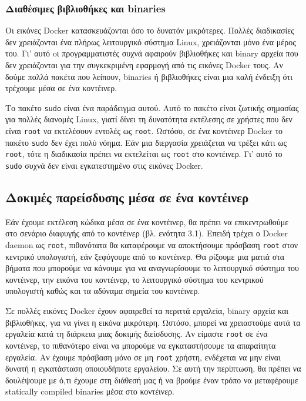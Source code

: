 \subsubsection{Διαθέσιμες βιβλιοθήκες και \textlatin{binaries}}

Οι εικόνες \textlatin{Docker} κατασκευάζονται όσο το δυνατόν μικρότερες. Πολλές
διαδικασίες δεν χρειάζονται ένα πλήρως λειτουργικό σύστημα \textlatin{Linux},
χρειάζονται μόνο ένα μέρος του. Γι' αυτό oι προγραμματιστές συχνά αφαιρούν
βιβλιοθήκες και \textlatin{binary} αρχεία που δεν χρειάζονται για την
συγκεκριμένη εφαρμογή από τις εικόνες \textlatin{Docker} τους. Αν δούμε πολλά
πακέτα που λείπουν, \textlatin{binaries} ή βιβλιοθήκες είναι μια καλή ένδειξη
ότι τρέχουμε μέσα σε ένα κοντέινερ.

Το πακέτο \texttt{\textlatin{sudo}} είναι ένα παράδειγμα αυτού. Αυτό το πακέτο
είναι ζωτικής σημασίας για πολλές διανομές \textlatin{Linux}, γιατί δίνει τη
δυνατότητα εκτέλεσης σε χρήστες που δεν είναι \texttt{\textlatin{root}} να
εκτελέσουν εντολές ως \texttt{\textlatin{root}}. Ωστόσο, σε ένα κοντέινερ
\textlatin{Docker} το πακέτο \texttt{\textlatin{sudo}} δεν έχει πολύ νόημα. Εάν
μια διεργασία χρειάζεται να τρέξει κάτι ως \texttt{\textlatin{root}}, τότε
η διαδικασία πρέπει να εκτελείται ως \texttt{\textlatin{root}} στο κοντέινερ.
Γι' αυτό το \texttt{\textlatin{sudo}} συχνά δεν είναι εγκατεστημένο στις εικόνες
\textlatin{Docker}.


\subsection{Δοκιμές παρείσδυσης μέσα σε ένα κοντέινερ}

Εάν έχουμε εκτέλεση κώδικα μέσα σε ένα κοντέινερ, θα πρέπει να επικεντρωθούμε
στο σενάριο διαφυγής από το κοντέινερ (βλ. ενότητα 3.1). Επειδή τρέχει ο
\textlatin{Docker daemon} ως \texttt{\textlatin{root}}, πιθανότατα θα
καταφέρουμε να αποκτήσουμε πρόσβαση \texttt{\textlatin{root}} στον κεντρικό
υπολογιστή, εάν ξεφύγουμε από το κοντέινερ. Θα ρίξουμε μια ματιά στα βήματα που
μπορούμε να κάνουμε για να αναγνωρίσουμε το λειτουργικό σύστημα του κοντέινερ, 
την εικόνα του κοντέινερ, το λειτουργικό σύστημα του κεντρικού υπολογιστή καθώς
και τα αδύναμα σημεία του κοντέινερ.

Σε πολλές εικόνες \textlatin{Docker} έχουν αφαιρεθεί τα περιττά εργαλεία,
\textlatin{binary} αρχεία και βιβλιοθήκες, για να γίνει η εικόνα μικρότερη.
Ωστόσο, μπορεί να χρειαστούμε αυτά τα εργαλεία κατά τη διάρκεια μιας δοκιμής
διείσδυσης. Αν είμαστε \texttt{\textlatin{root}} σε ένα κοντέινερ, το πιθανότερο
είναι να  μπορούμε να εγκαταστήσουμε τα απαραίτητα εργαλεία. Αν έχουμε πρόσβαση
μόνο σε μη \texttt{\textlatin{root}} χρήστη, ενδέχεται να μην είναι δυνατή η
εγκατάσταση οποιουδήποτε εργαλείου. Σε αυτή την περίπτωση, θα πρέπει να
δουλέψουμε με ό,τι έχουμε στη διάθεσή μας ή να βρούμε έναν τρόπο να μεταφέρουμε
\textlatin{statically compiled binaries} μέσα στο κοντέινερ.

